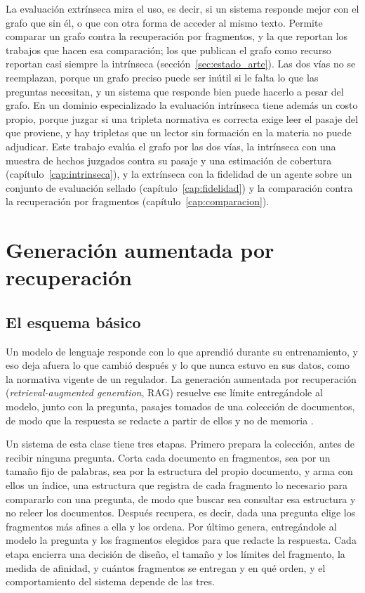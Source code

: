 \documentclass[12pt,a4paper]{report}
\begin{document}
La evaluación extrínseca mira el uso, es decir, si un sistema responde mejor con el grafo que sin él, o que con otra forma de acceder al mismo texto. Permite comparar un grafo contra la recuperación por fragmentos, y la que reportan los trabajos que hacen esa comparación; los que publican el grafo como recurso reportan casi siempre la intrínseca (sección~\ref{sec:estado_arte}). Las dos vías no se reemplazan, porque un grafo preciso puede ser inútil si le falta lo que las preguntas necesitan, y un sistema que responde bien puede hacerlo a pesar del grafo. En un dominio especializado la evaluación intrínseca tiene además un costo propio, porque juzgar si una tripleta normativa es correcta exige leer el pasaje del que proviene, y hay tripletas que un lector sin formación en la materia no puede adjudicar. Este trabajo evalúa el grafo por las dos vías, la intrínseca con una muestra de hechos juzgados contra su pasaje y una estimación de cobertura (capítulo~\ref{cap:intrinseca}), y la extrínseca con la fidelidad de un agente sobre un conjunto de evaluación sellado (capítulo~\ref{cap:fidelidad}) y la comparación contra la recuperación por fragmentos (capítulo~\ref{cap:comparacion}).



\section{Generación aumentada por recuperación}
\label{sec:mt_rag}

\subsection{El esquema básico}

Un modelo de lenguaje responde con lo que aprendió durante su entrenamiento, y eso deja afuera lo que cambió después y lo que nunca estuvo en sus datos, como la normativa vigente de un regulador. La generación aumentada por recuperación (\emph{retrieval-augmented generation}, RAG) resuelve ese límite entregándole al modelo, junto con la pregunta, pasajes tomados de una colección de documentos, de modo que la respuesta se redacte a partir de ellos y no de memoria \cite{lewis2020rag}.

Un sistema de esta clase tiene tres etapas. Primero prepara la colección, antes de recibir ninguna pregunta. Corta cada documento en fragmentos, sea por un tamaño fijo de palabras, sea por la estructura del propio documento, y arma con ellos un índice, una estructura que registra de cada fragmento lo necesario para compararlo con una pregunta, de modo que buscar sea consultar esa estructura y no releer los documentos. Después recupera, es decir, dada una pregunta elige los fragmentos más afines a ella y los ordena. Por último genera, entregándole al modelo la pregunta y los fragmentos elegidos para que redacte la respuesta. Cada etapa encierra una decisión de diseño, el tamaño y los límites del fragmento, la medida de afinidad, y cuántos fragmentos se entregan y en qué orden, y el comportamiento del sistema depende de las tres.
\end{document}
